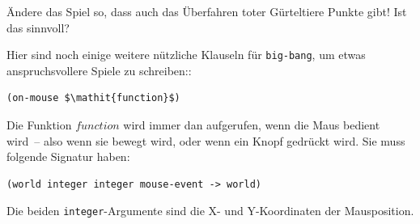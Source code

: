 \begin{aufgabeinline}
  Ändere das Spiel so, dass auch das Überfahren toter Gürteltiere
  Punkte gibt!  Ist das sinnvoll?
\end{aufgabeinline}

Hier sind noch einige weitere nützliche Klauseln für
\lstinline{big-bang}, um etwas anspruchsvollere Spiele zu schreiben::
%
\begin{lstlisting}
(on-mouse $\mathit{function}$)
\end{lstlisting}
%
Die Funktion $\mathit{function}$ wird immer dan aufgerufen, wenn die
Maus bedient wird~-- also wenn sie bewegt wird, oder wenn ein Knopf
gedrückt wird.  Sie muss folgende Signatur haben:
%
\begin{lstlisting}
(world integer integer mouse-event -> world)
\end{lstlisting}
%
Die beiden \lstinline{integer}-Argumente sind die X- und Y-Koordinaten
der Mausposition.

